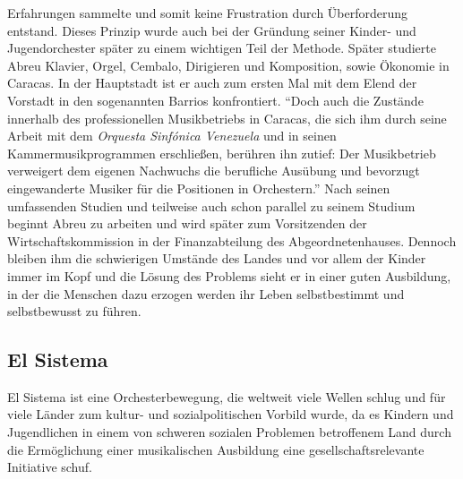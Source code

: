 Erfahrungen sammelte und somit keine Frustration durch Überforderung entstand.
Dieses Prinzip wurde auch bei der Gründung seiner Kinder- und Jugendorchester
später zu einem wichtigen Teil der Methode. Später studierte Abreu Klavier,
Orgel, Cembalo, Dirigieren und Komposition, sowie Ökonomie in Caracas. In der
Hauptstadt ist er auch zum ersten Mal mit dem Elend der Vorstadt in den
sogenannten Barrios konfrontiert. \enquote{Doch auch die Zustände innerhalb des
professionellen Musikbetriebs in Caracas, die sich ihm durch seine Arbeit mit
dem \emph{Orquesta Sinfónica Venezuela} und in seinen Kammermusikprogrammen
erschließen, berühren ihn zutief: Der Musikbetrieb verweigert dem eigenen
Nachwuchs die berufliche Ausübung und bevorzugt eingewanderte Musiker für die
Positionen in Orchestern.}\autocite[28]{kaufmann:el_sistema} Nach seinen
umfassenden Studien und teilweise auch schon parallel zu seinem Studium beginnt
Abreu zu arbeiten und wird später zum Vorsitzenden der Wirtschaftskommission in
der Finanzabteilung des Abgeordnetenhauses. Dennoch bleiben ihm die schwierigen
Umstände des Landes und vor allem der Kinder immer im Kopf und die Lösung
des Problems sieht er in einer guten Ausbildung, in der die Menschen dazu
erzogen werden ihr Leben selbstbestimmt und selbstbewusst zu
führen.\autocite[31]{kaufmann:el_sistema} 



\subsection{El Sistema}

El Sistema ist eine Orchesterbewegung, die weltweit viele Wellen schlug und für
viele Länder zum kultur- und sozialpolitischen Vorbild wurde, da es Kindern und
Jugendlichen in einem von schweren sozialen Problemen betroffenem Land durch die
Ermöglichung einer musikalischen Ausbildung eine gesellschaftsrelevante
Initiative schuf. 


